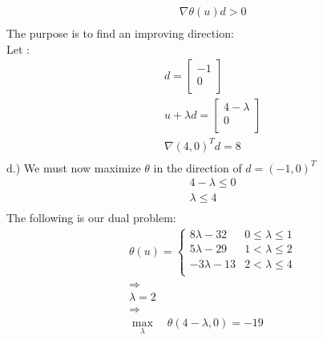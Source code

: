 \documentclass[12pt]{article}
\begin{document}
        \begin{align*}
            &\nabla \theta(u) d > 0\\
        \end{align*}
    The purpose is to find an improving direction: \\
    Let :\\
        \begin{align*}
            &d = 
                \begin{bmatrix}
                    -1 \\
                    0\\
                \end{bmatrix}\\
            & u + \lambda d = 
                \begin{bmatrix}
                    4 - \lambda \\
                    0\\
                \end{bmatrix}\\
            &\nabla (4,0)^T d = 8 \\
        \end{align*}
    d.) We must now maximize $\theta$ in the direction of $d = (-1,0)^T$\\
        \begin{align*}
            &4-\lambda \leq 0\\
            &\lambda \leq 4\\
        \end{align*}
    The following is our dual problem:\\
        \begin{align*}
            &\theta(u) = 
                \begin{cases} 
                    8\lambda -32 & 0 \leq \lambda \leq 1\\
                    5\lambda -29 & 1 < \lambda \leq 2\\
                    -3\lambda -13 & 2 < \lambda \leq 4\\
                \end{cases}\\
            &\Rightarrow\\
            &\lambda = 2 \\
            &\Rightarrow\\
            &\max_{\lambda} \quad \theta(4-\lambda, 0) = -19\\
        \end{align*}
\end{document}
